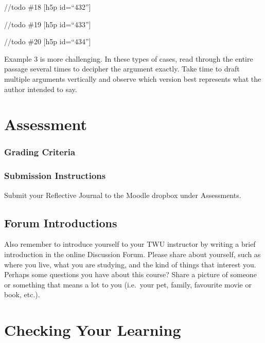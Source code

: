 \documentclass[
]{book}
\begin{document}
//todo \#18
{[}h5p id=``432''{]}

//todo \#19
{[}h5p id=``433''{]}

//todo \#20
{[}h5p id=``434''{]}

Example 3 is more challenging. In these types of cases, read through the entire passage several times to decipher the argument exactly. Take time to draft multiple arguments vertically and observe which version best represents what the author intended to say.

\hypertarget{assessment-1}{%
\section*{Assessment}\label{assessment-1}}

\hypertarget{grading-criteria-1}{%
\subsubsection*{Grading Criteria}\label{grading-criteria-1}}

\hypertarget{submission-instructions-1}{%
\subsubsection*{Submission Instructions}\label{submission-instructions-1}}

Submit your Reflective Journal to the Moodle dropbox under Assessments.

\hypertarget{forum-introductions-1}{%
\subsection*{Forum Introductions}\label{forum-introductions-1}}

Also remember to introduce yourself to your TWU instructor by writing a brief introduction in the online Discussion Forum. Please share about yourself, such as where you live, what you are studying, and the kind of things that interest you. Perhaps some questions you have about this course? Share a picture of someone or something that means a lot to you (i.e.~your pet, family, favourite movie or book, etc.).

\hypertarget{checking-your-learning-1}{%
\section*{Checking Your Learning}\label{checking-your-learning-1}}
\end{document}
